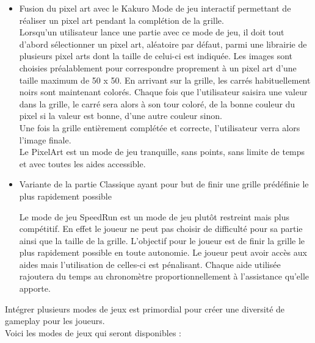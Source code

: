 {\begin{itemize}
        \item {}
            {Fusion du pixel art avec le Kakuro}
            {
                Mode de jeu interactif permettant de réaliser un pixel art pendant la complétion de la grille.
                \\
                Lorsqu'un utilisateur lance une partie avec ce mode de jeu, il doit tout d'abord sélectionner un pixel art, aléatoire par défaut, parmi une librairie de plusieurs pixel arts dont la taille de celui-ci est indiquée. Les images sont choisies préalablement pour correspondre proprement à un pixel art d'une taille maximum de 50 x 50.
                En arrivant sur la grille, les carrés habituellement noirs sont maintenant colorés.
                Chaque fois que l'utilisateur saisira une valeur dans la grille, le carré sera alors à son tour coloré, de la bonne couleur du pixel si la valeur est bonne, d'une autre couleur sinon.
                \\
                Une fois la grille entièrement complétée et correcte, l'utilisateur verra alors l'image finale.
                \\
                Le PixelArt est un mode de jeu tranquille, sans points, sans limite de temps et avec toutes les aides accessible.
            }
        \item {}
            {Variante de la partie Classique ayant pour but de finir une grille prédéfinie le plus rapidement possible}
            {
                Le mode de jeu SpeedRun est un mode de jeu plutôt restreint mais plus compétitif. En effet le joueur ne peut pas choisir de difficulté pour sa partie ainsi que la taille de la grille. L'objectif pour le joueur est de finir la grille le plus rapidement possible en toute autonomie. Le joueur peut avoir accès aux aides mais l'utilisation de celles-ci est pénalisant. Chaque aide utilisée rajoutera du temps au chronomètre proportionnellement à l'assistance qu'elle apporte.
                
            }
	\end{itemize}
}
{
Intégrer plusieurs modes de jeux est primordial pour créer une diversité de gameplay pour les joueurs.\\
Voici les modes de jeux qui seront disponibles :
}
